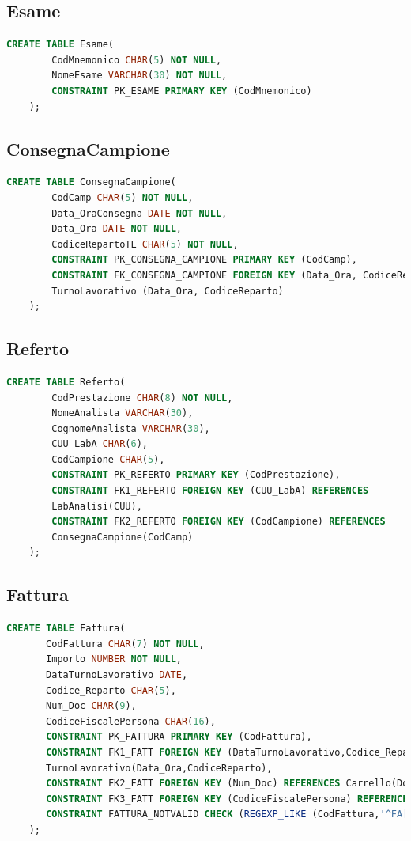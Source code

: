\documentclass[12pt]{report}
\begin{document}
\subsection*{Esame}
\begin{lstlisting}[language=SQL]
    CREATE TABLE Esame(
		CodMnemonico CHAR(5) NOT NULL,
		NomeEsame VARCHAR(30) NOT NULL,
		CONSTRAINT PK_ESAME PRIMARY KEY (CodMnemonico)
    );
\end{lstlisting}

\subsection*{ConsegnaCampione}
\begin{lstlisting}[language=SQL]
    CREATE TABLE ConsegnaCampione(
		CodCamp CHAR(5) NOT NULL,
		Data_OraConsegna DATE NOT NULL,
		Data_Ora DATE NOT NULL,
		CodiceRepartoTL CHAR(5) NOT NULL,
		CONSTRAINT PK_CONSEGNA_CAMPIONE PRIMARY KEY (CodCamp),
		CONSTRAINT FK_CONSEGNA_CAMPIONE FOREIGN KEY (Data_Ora, CodiceRepartoTL) REFERENCES 
		TurnoLavorativo (Data_Ora, CodiceReparto)
    );
\end{lstlisting}

\newpage

\subsection*{Referto}
\begin{lstlisting}[language=SQL]
    CREATE TABLE Referto(
	    CodPrestazione CHAR(8) NOT NULL,
	    NomeAnalista VARCHAR(30),
	    CognomeAnalista VARCHAR(30),
	    CUU_LabA CHAR(6),
	    CodCampione CHAR(5),
	    CONSTRAINT PK_REFERTO PRIMARY KEY (CodPrestazione),
	    CONSTRAINT FK1_REFERTO FOREIGN KEY (CUU_LabA) REFERENCES 
	    LabAnalisi(CUU),
	    CONSTRAINT FK2_REFERTO FOREIGN KEY (CodCampione) REFERENCES
	    ConsegnaCampione(CodCamp)
    );
\end{lstlisting}

\subsection*{Fattura}
\begin{lstlisting}[language=SQL]
     CREATE TABLE Fattura(
	   CodFattura CHAR(7) NOT NULL,
	   Importo NUMBER NOT NULL,
	   DataTurnoLavorativo DATE,
	   Codice_Reparto CHAR(5),
	   Num_Doc CHAR(9),
	   CodiceFiscalePersona CHAR(16),
	   CONSTRAINT PK_FATTURA PRIMARY KEY (CodFattura),
	   CONSTRAINT FK1_FATT FOREIGN KEY (DataTurnoLavorativo,Codice_Reparto) REFERENCES
	   TurnoLavorativo(Data_Ora,CodiceReparto),
	   CONSTRAINT FK2_FATT FOREIGN KEY (Num_Doc) REFERENCES Carrello(Doc_N),
	   CONSTRAINT FK3_FATT FOREIGN KEY (CodiceFiscalePersona) REFERENCES Persona(CF),
	   CONSTRAINT FATTURA_NOTVALID CHECK (REGEXP_LIKE (CodFattura,'^FA[0-9]{2}[A-Za-z]{3}$'))
    );
\end{lstlisting}
\end{document}
